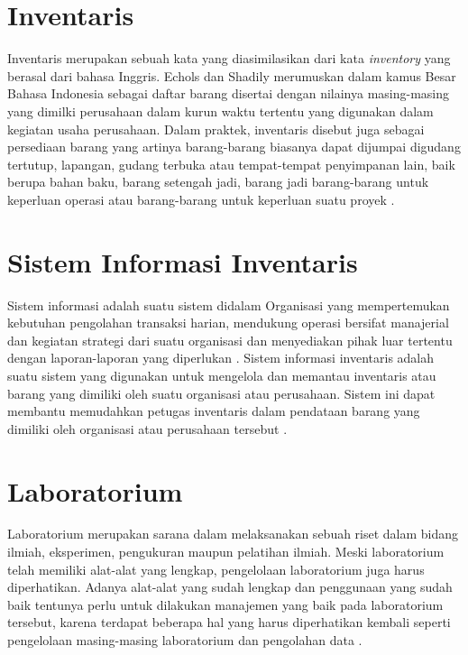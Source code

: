 \section{Inventaris}
Inventaris merupakan sebuah kata yang diasimilasikan dari kata \textit{inventory} yang berasal dari bahasa Inggris. Echols dan Shadily merumuskan dalam kamus Besar Bahasa Indonesia sebagai daftar barang disertai dengan nilainya masing-masing yang dimilki perusahaan dalam kurun waktu tertentu yang digunakan dalam kegiatan usaha perusahaan. Dalam praktek, inventaris disebut juga sebagai persediaan barang yang artinya barang-barang biasanya dapat dijumpai digudang tertutup, lapangan, gudang terbuka atau tempat-tempat penyimpanan lain, baik berupa bahan baku, barang setengah jadi, barang jadi barang-barang untuk keperluan operasi atau barang-barang untuk keperluan suatu proyek \cite{novendri2019aplikasi}.
\section{Sistem Informasi Inventaris}
Sistem informasi adalah suatu sistem didalam Organisasi yang mempertemukan kebutuhan pengolahan transaksi harian, mendukung operasi bersifat manajerial dan kegiatan strategi dari suatu organisasi dan menyediakan pihak luar tertentu dengan laporan-laporan yang diperlukan \cite{laila2011sistem}. Sistem informasi inventaris adalah suatu sistem yang digunakan untuk mengelola dan memantau inventaris atau barang yang dimiliki oleh suatu organisasi atau perusahaan. Sistem ini dapat membantu memudahkan petugas inventaris dalam pendataan barang yang dimiliki oleh organisasi atau perusahaan tersebut \cite{Yanti2021SISTEMII}.
\section{Laboratorium}
Laboratorium merupakan sarana dalam melaksanakan sebuah riset dalam bidang ilmiah, eksperimen, pengukuran maupun pelatihan ilmiah. Meski laboratorium telah memiliki alat-alat yang lengkap, pengelolaan laboratorium juga harus diperhatikan. Adanya alat-alat yang sudah lengkap dan penggunaan yang sudah baik tentunya perlu untuk dilakukan manajemen yang baik pada laboratorium tersebut, karena terdapat beberapa hal yang harus diperhatikan kembali seperti pengelolaan masing-masing laboratorium dan pengolahan data \cite{sweden2022rancang}.
